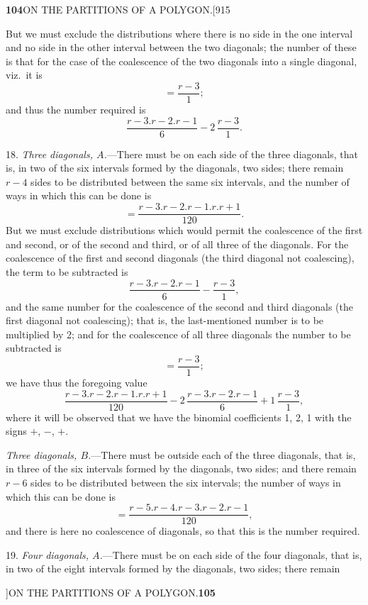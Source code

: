 \documentclass[11pt]{article}
\begin{document}
\newpage
\noindent\textbf{104}\hfill ON THE PARTITIONS OF A POLYGON.\hfill[915

\smallskip
But we must exclude the distributions where there is no side in the one
interval and no side in the other interval between the two diagonals; the
number of these is that for the case of the coalescence of the two diagonals
into a single diagonal, viz.\ it is
\[
=\frac{r-3}{1};
\]
and thus the number required is
\[
\frac{r-3.r-2.r-1}{6}-2\,\frac{r-3}{1}.
\]

\hspace{1em} 18. \emph{Three diagonals, $A$.}---There must be on each side of
the three diagonals, that is, in two of the six intervals formed by the
diagonals, two sides; there remain $r-4$ sides to be distributed between the
same six intervals, and the number of ways in which this can be done is
\[
=\frac{r-3.r-2.r-1.r.r+1}{120}.
\]
But we must exclude distributions which would permit the coalescence of the
first and second, or of the second and third, or of all three of the
diagonals. For the coalescence of the first and second diagonals (the third
diagonal not coalescing), the term to be subtracted is
\[
\frac{r-3.r-2.r-1}{6}-\frac{r-3}{1},
\]
and the same number for the coalescence of the second and third diagonals
(the first diagonal not coalescing); that is, the last-mentioned number is to
be multiplied by 2; and for the coalescence of all three diagonals the
number to be subtracted is
\[
=\frac{r-3}{1};
\]
we have thus the foregoing value
\[
\frac{r-3.r-2.r-1.r.r+1}{120}-2\,\frac{r-3.r-2.r-1}{6}+1\,\frac{r-3}{1},
\]
where it will be observed that we have the binomial coefficients 1, 2, 1
with the signs $+$, $-$, $+$.

\hspace{1em} \emph{Three diagonals, $B$.}---There must be outside each of the
three diagonals, that is, in three of the six intervals formed by the
diagonals, two sides; and there remain $r-6$ sides to be distributed between
the six intervals; the number of ways in which this can be done is
\[
=\frac{r-5.r-4.r-3.r-2.r-1}{120},
\]
and there is here no coalescence of diagonals, so that this is the number
required.

\hspace{1em} 19. \emph{Four diagonals, $A$.}---There must be on each side of
the four diagonals, that is, in two of the eight intervals formed by the
diagonals, two sides; there remain

\newpage
{}]\hfill ON THE PARTITIONS OF A POLYGON.\hfill\textbf{105}
\end{document}
